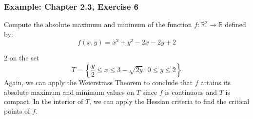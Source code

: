 \documentclass[11pt]{article}
\begin{document}
\subsubsection*{Example: Chapter 2.3, Exercise 6}
Compute the absolute maximum and minimum of the function \(f : \mathbb{R}^2 \to \mathbb{R}\) defined by:
\[f(x, y) = x^2 + y^2 - 2x - 2y + 2\]
\begin{multicols}{2}
on the set 
\[T = \left\{\frac{y}{2} \leq x \leq 3 - \sqrt{2y}, \ 0 \leq y \leq 2 \right\}\]
Again, we can apply the Weierstrass Theorem to conclude that \(f\) attains its absolute maximum and minimum values on \(T\) since \(f\) is continuous and \(T\) is compact.
In the interior of \(T\), we can apply the Hessian criteria to find the critical points of \(f\). 

\begin{center}
\end{center}

\end{multicols}
\end{document}
